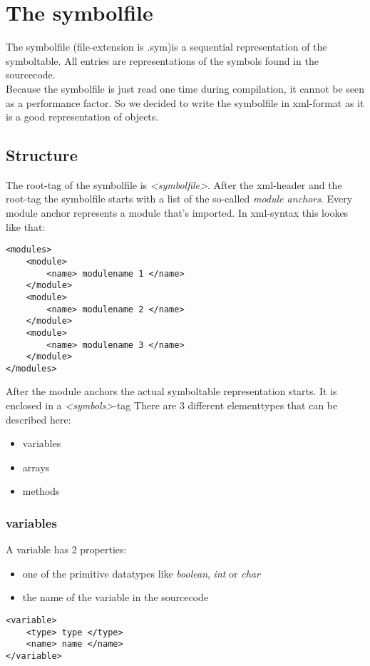 \section{The symbolfile}
The symbolfile (file-extension is .sym)is a sequential representation of the
symboltable. All entries
are representations of the symbols found in the sourcecode. \\
Because the symbolfile is just read one time during compilation, it cannot be
seen as a performance factor. So we decided to write the symbolfile in
xml-format as it is a good representation of objects. 
\subsection{Structure}
The root-tag of the symbolfile is \emph{<symbolfile>}. After the xml-header and
the root-tag the symbolfile starts with a list of the so-called \emph{module anchors}. Every
module anchor represents a module that's imported. In xml-syntax this lookes
like that:
\begin{lstlisting}[caption={module anchors}]
<modules>
	<module>
		<name> modulename 1 </name>
	</module>
	<module>
		<name> modulename 2 </name>
	</module>
	<module>
		<name> modulename 3 </name>
	</module>
</modules>
\end{lstlisting}

After the module anchors the actual symboltable representation starts. It is
enclosed in a \emph{<symbols>}-tag There are 3 different elementtypes that can be described here:
\begin{itemize}
  \item variables
  \item arrays
  \item methods 
\end{itemize}
\subsubsection{variables}
A variable has 2 properties: 
\begin{itemize}
  \item one of the primitive datatypes like \emph{boolean}, \emph{int} or \emph{char}
  \item the name of the variable in the sourcecode
\end{itemize}

\begin{lstlisting}[caption={variables}]
<variable>
	<type> type </type>
	<name> name </name>
</variable>
\end{lstlisting}

